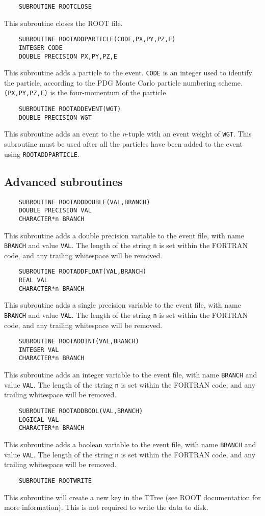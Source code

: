 \documentclass[a4paper,12pt]{article}
\begin{document}
\begin{verbatim}
    SUBROUTINE ROOTCLOSE\end{verbatim}
This subroutine closes the ROOT file.

\begin{verbatim}
    SUBROUTINE ROOTADDPARTICLE(CODE,PX,PY,PZ,E)
    INTEGER CODE
    DOUBLE PRECISION PX,PY,PZ,E\end{verbatim}
This subroutine adds a particle to the event. \verb|CODE| is an integer used to identify the particle, according to the PDG Monte Carlo particle numbering scheme. \verb|(PX,PY,PZ,E)| is the four-momentum of the particle.

\begin{verbatim}
    SUBROUTINE ROOTADDEVENT(WGT)
    DOUBLE PRECISION WGT\end{verbatim}
This subroutine adds an event to the \emph{n}-tuple with an event weight of \verb|WGT|. This subroutine must be used after all the particles have been added to the event using \verb|ROOTADDPARTICLE|.

\subsection{Advanced subroutines}
\begin{verbatim}
    SUBROUTINE ROOTADDDOUBLE(VAL,BRANCH)
    DOUBLE PRECISION VAL
    CHARACTER*n BRANCH\end{verbatim}
This subroutine adds a double precision variable to the event file, with name \verb|BRANCH| and value \verb|VAL|. The length of the string \verb|n| is set within the FORTRAN code, and any trailing whitespace will be removed.

\begin{verbatim}
    SUBROUTINE ROOTADDFLOAT(VAL,BRANCH)
    REAL VAL
    CHARACTER*n BRANCH\end{verbatim}
This subroutine adds a single precision variable to the event file, with name \verb|BRANCH| and value \verb|VAL|. The length of the string \verb|n| is set within the FORTRAN code, and any trailing whitespace will be removed.

\begin{verbatim}
    SUBROUTINE ROOTADDINT(VAL,BRANCH)
    INTEGER VAL
    CHARACTER*n BRANCH\end{verbatim}
This subroutine adds an integer variable to the event file, with name \verb|BRANCH| and value \verb|VAL|. The length of the string \verb|n| is set within the FORTRAN code, and any trailing whitespace will be removed.

\begin{verbatim}
    SUBROUTINE ROOTADDBOOL(VAL,BRANCH)
    LOGICAL VAL
    CHARACTER*n BRANCH\end{verbatim}
This subroutine adds a boolean variable to the event file, with name \verb|BRANCH| and value \verb|VAL|. The length of the string \verb|n| is set within the FORTRAN code, and any trailing whitespace will be removed.

\begin{verbatim}
    SUBROUTINE ROOTWRITE\end{verbatim}
This subroutine will create a new key in the TTree (see ROOT documentation for more information). This is not required to write the data to disk.
\end{document}

